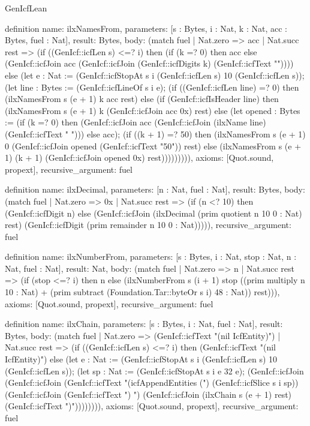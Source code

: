 \begin{lexlean}{GenIcfLean}
\begin{semanticmodule}
{definition{
  name: ilxNamesFrom,
  parameters: [s : Bytes, i : Nat, k : Nat, acc : Bytes, fuel : Nat],
  result: Bytes,
  body: (match fuel
    | Nat.zero => acc
    | Nat.succ rest => (if ((GenIcf::icfLen s) <=? i) then (if (k =? 0) then acc else (GenIcf::icfJoin acc (GenIcf::icfJoin (GenIcf::icfDigits k) (GenIcf::icfText "\n")))) else (let e : Nat := (GenIcf::icfStopAt s i (GenIcf::icfLen s) 10 (GenIcf::icfLen s)); (let line : Bytes := (GenIcf::icfLineOf s i e); (if ((GenIcf::icfLen line) =? 0) then (ilxNamesFrom s (e + 1) k acc rest) else (if (GenIcf::icfIsHeader line) then (ilxNamesFrom s (e + 1) k (GenIcf::icfJoin acc 0x) rest) else (let opened : Bytes := (if (k =? 0) then (GenIcf::icfJoin acc (GenIcf::icfJoin (ilxName line) (GenIcf::icfText " "))) else acc); (if ((k + 1) =? 50) then (ilxNamesFrom s (e + 1) 0 (GenIcf::icfJoin opened (GenIcf::icfText "50\n")) rest) else (ilxNamesFrom s (e + 1) (k + 1) (GenIcf::icfJoin opened 0x) rest))))))))),
  axioms: [Quot.sound, propext],
  recursive_argument: fuel
}

definition{
  name: ilxDecimal,
  parameters: [n : Nat, fuel : Nat],
  result: Bytes,
  body: (match fuel
    | Nat.zero => 0x
    | Nat.succ rest => (if (n <? 10) then (GenIcf::icfDigit n) else (GenIcf::icfJoin (ilxDecimal (prim quotient n 10 0 : Nat) rest) (GenIcf::icfDigit (prim remainder n 10 0 : Nat))))),
  recursive_argument: fuel
}

definition{
  name: ilxNumberFrom,
  parameters: [s : Bytes, i : Nat, stop : Nat, n : Nat, fuel : Nat],
  result: Nat,
  body: (match fuel
    | Nat.zero => n
    | Nat.succ rest => (if (stop <=? i) then n else (ilxNumberFrom s (i + 1) stop ((prim multiply n 10 : Nat) + (prim subtract (Foundation.Tar::byteOr s i) 48 : Nat)) rest))),
  axioms: [Quot.sound, propext],
  recursive_argument: fuel
}

definition{
  name: ilxChain,
  parameters: [s : Bytes, i : Nat, fuel : Nat],
  result: Bytes,
  body: (match fuel
    | Nat.zero => (GenIcf::icfText "(nil IcfEntity)")
    | Nat.succ rest => (if ((GenIcf::icfLen s) <=? i) then (GenIcf::icfText "(nil IcfEntity)") else (let e : Nat := (GenIcf::icfStopAt s i (GenIcf::icfLen s) 10 (GenIcf::icfLen s)); (let sp : Nat := (GenIcf::icfStopAt s i e 32 e); (GenIcf::icfJoin (GenIcf::icfJoin (GenIcf::icfText "(icfAppendEntities (") (GenIcf::icfSlice s i sp)) (GenIcf::icfJoin (GenIcf::icfText ") ") (GenIcf::icfJoin (ilxChain s (e + 1) rest) (GenIcf::icfText ")")))))))),
  axioms: [Quot.sound, propext],
  recursive_argument: fuel
}

}
\end{semanticmodule}
\end{lexlean}
